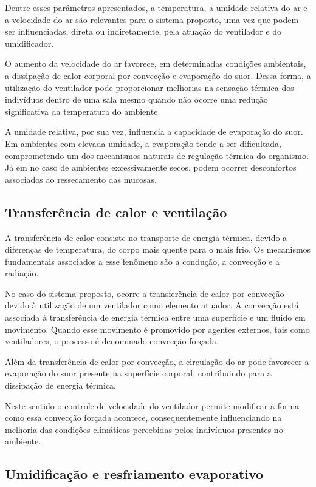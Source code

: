 \documentclass[conference]{IEEEtran}
\begin{document}
Dentre esses parâmetros apresentados, a temperatura, a umidade relativa do ar e a velocidade do ar são relevantes para o sistema proposto, uma vez que podem ser influenciadas, direta ou indiretamente, pela atuação do ventilador e do umidificador.

O aumento da velocidade do ar favorece, em determinadas condições ambientais, a dissipação de calor corporal por convecção e evaporação do suor. Dessa forma, a utilização do ventilador pode proporcionar melhorias na sensação térmica dos indivíduos dentro de uma sala mesmo quando não ocorre uma redução significativa da temperatura do ambiente.

A umidade relativa, por sua vez, influencia a capacidade de evaporação do suor. Em ambientes com elevada umidade, a evaporação tende a ser dificultada, comprometendo um dos mecanismos naturais de regulação térmica do organismo. Já em no caso de ambientes excessivamente secos, podem ocorrer desconfortos associados ao ressecamento das mucosas.

\subsection{Transferência de calor e ventilação}

A transferência de calor consiste no transporte de energia térmica, devido a diferenças de temperatura, do corpo mais quente para o mais frio. Os mecanismos fundamentais associados a esse fenômeno são a condução, a convecção e a radiação.

No caso do sistema proposto, ocorre a transferência de calor por convecção devido à utilização de um ventilador como elemento atuador. A convecção está associada à transferência de energia térmica entre uma superfície e um fluido em movimento. Quando esse movimento é promovido por agentes externos, tais como ventiladores, o processo é denominado convecção forçada.

Além da transferência de calor por convecção, a circulação do ar pode favorecer a evaporação do suor presente na superfície corporal, contribuindo para a dissipação de energia térmica.

Neste sentido o controle de velocidade do ventilador permite modificar a forma como essa convecção forçada acontece, consequentemente influenciando na melhoria das condições climáticas percebidas pelos indivíduos presentes no ambiente.

\subsection{Umidificação e resfriamento evaporativo}
\end{document}
